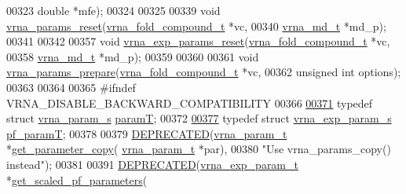 \begin{DoxyCode}
00323                         \textcolor{keywordtype}{double}                *mfe);
00324 
00325 
00339 \textcolor{keywordtype}{void} \mbox{\hyperlink{group__energy__parameters_gac40dc82e48a72a97cfc58b9da08a7792}{vrna\_params\_reset}}(\mbox{\hyperlink{group__fold__compound_structvrna__fc__s}{vrna\_fold\_compound\_t}} *vc,
00340                        \mbox{\hyperlink{group__model__details_structvrna__md__s}{vrna\_md\_t}}            *md\_p);
00341 
00342 
00357 \textcolor{keywordtype}{void} \mbox{\hyperlink{group__energy__parameters_gaa5409218068be84d7b50c78fbdaa85a9}{vrna\_exp\_params\_reset}}(\mbox{\hyperlink{group__fold__compound_structvrna__fc__s}{vrna\_fold\_compound\_t}} *vc,
00358                            \mbox{\hyperlink{group__model__details_structvrna__md__s}{vrna\_md\_t}}            *md\_p);
00359 
00360 
00361 \textcolor{keywordtype}{void} \mbox{\hyperlink{group__energy__parameters_ga881878603a5668e49316d0cd1a10580a}{vrna\_params\_prepare}}(\mbox{\hyperlink{group__fold__compound_structvrna__fc__s}{vrna\_fold\_compound\_t}} *vc,
00362                          \textcolor{keywordtype}{unsigned} \textcolor{keywordtype}{int}         options);
00363 
00364 
00365 \textcolor{preprocessor}{#ifndef VRNA\_DISABLE\_BACKWARD\_COMPATIBILITY}
00366 
\mbox{\hyperlink{group__energy__parameters_ga857dde86357d306cc902f0d8b2797659}{00371}} \textcolor{keyword}{typedef} \textcolor{keyword}{struct }\mbox{\hyperlink{group__energy__parameters_structvrna__param__s}{vrna\_param\_s}} \mbox{\hyperlink{group__energy__parameters_structvrna__param__s}{paramT}};
00372 
\mbox{\hyperlink{group__energy__parameters_ga8bffe1828e2cbec101769f5cc0b1535b}{00377}} \textcolor{keyword}{typedef} \textcolor{keyword}{struct }\mbox{\hyperlink{group__energy__parameters_structvrna__exp__param__s}{vrna\_exp\_param\_s}} \mbox{\hyperlink{group__energy__parameters_structvrna__exp__param__s}{pf\_paramT}};
00378 
00379 \mbox{\hyperlink{params_8h_aab347a3c03fbe8e7319551b9fa0cce4a}{DEPRECATED}}(\mbox{\hyperlink{group__energy__parameters_structvrna__param__s}{vrna\_param\_t}} *\mbox{\hyperlink{group__energy__parameters_ga1c252a1ef78410efcdcc1998f3c415cb}{get\_parameter\_copy}}(
      \mbox{\hyperlink{group__energy__parameters_structvrna__param__s}{vrna\_param\_t}} *par),
00380 \textcolor{stringliteral}{"Use vrna\_params\_copy() instead"});
00381 
00391 \mbox{\hyperlink{params_8h_aab347a3c03fbe8e7319551b9fa0cce4a}{DEPRECATED}}(\mbox{\hyperlink{group__energy__parameters_structvrna__exp__param__s}{vrna\_exp\_param\_t}} *\mbox{\hyperlink{group__energy__parameters_gabf3b9271c41dd3fac02d56e0b02b3344}{get\_scaled\_pf\_parameters}}(\textcolor{keywordtype}{
}
\end{DoxyCode}
